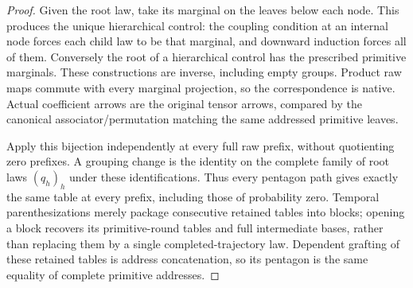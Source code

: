 \documentclass[11pt]{article}
\begin{document}
\begin{proof}
Given the root law, take its marginal on the leaves below each node. This produces the unique hierarchical control: the coupling condition at an internal node forces each child law to be that marginal, and downward induction forces all of them. Conversely the root of a hierarchical control has the prescribed primitive marginals. These constructions are inverse, including empty groups. Product raw maps commute with every marginal projection, so the correspondence is native. Actual coefficient arrows are the original tensor arrows, compared by the canonical associator/permutation matching the same addressed primitive leaves.

Apply this bijection independently at every full raw prefix, without quotienting zero prefixes. A grouping change is the identity on the complete family of root laws $(q_h)_h$ under these identifications. Thus every pentagon path gives exactly the same table at every prefix, including those of probability zero. Temporal parenthesizations merely package consecutive retained tables into blocks; opening a block recovers its primitive-round tables and full intermediate bases, rather than replacing them by a single completed-trajectory law. Dependent grafting of these retained tables is address concatenation, so its pentagon is the same equality of complete primitive addresses.


\end{proof}
\end{document}
